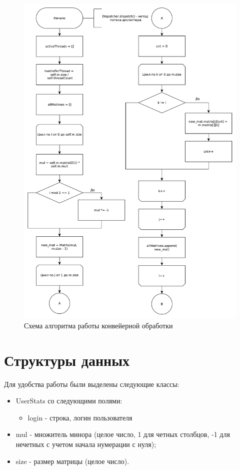 \documentclass[12pt]{report}
\begin{document}
    \begin{figure}[H]
    	\centering
    	\includegraphics[width=0.85\linewidth]{img/solver_part_1}
    	\caption{Схема алгоритма работы конвейерной обработки}
    	\label{img:solver_1}
    \end{figure}
    
    \section{Структуры данных}
    Для удобства работы были выделены следующие классы:
    \begin{itemize}
    	\item UserStats со следующими полями:
    	\begin{itemize}
    		\item login - строка, логин пользователя
    	\end{itemize}
    	\item mul - множитель минора (целое число, 1 для четных столбцов, -1 для нечетных с учетом начала нумерации с нуля);
    	\item size - размер матрицы (целое число).
    \end{itemize}
    
\end{document}
